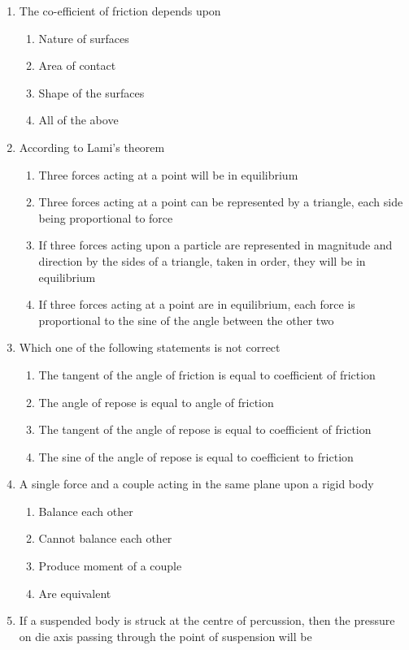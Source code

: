 \documentclass[11pt,a4paper]{article}
\begin{document}
\begin{enumerate}
\item{The co-efficient of friction depends upon}
\begin{enumerate}[label=\Alph*.]
\item{Nature of surfaces}
\item{Area of contact}
\item{Shape of the surfaces}
\item{All of the above}
\end{enumerate}
\item{According to Lami's theorem}
\begin{enumerate}[label=\Alph*.]
\item{Three forces acting at a point will be in equilibrium}
\item{Three forces acting at a point can be represented by a triangle, each side being proportional to force}
\item{If three forces acting upon a particle are represented in magnitude and direction by the sides of a triangle, taken in order, they will be in equilibrium}
\item{If three forces acting at a point are in equilibrium, each force is proportional to the sine of the angle between the other two}
\end{enumerate}
\item{Which one of the following statements is not correct}
\begin{enumerate}[label=\Alph*.]
\item{The tangent of the angle of friction is equal to coefficient of friction}
\item{The angle of repose is equal to angle of friction}
\item{The tangent of the angle of repose is equal to coefficient of friction}
\item{The sine of the angle of repose is equal to coefficient to friction}
\end{enumerate}
\item{A single force and a couple acting in the same plane upon a rigid body}
\begin{enumerate}[label=\Alph*.]
\item{Balance each other}
\item{Cannot balance each other}
\item{Produce moment of a couple}
\item{Are equivalent}
\end{enumerate}
\item{If a suspended body is struck at the centre of percussion, then the pressure on die axis passing through the point of suspension will be}

\end{enumerate}
\end{document}
